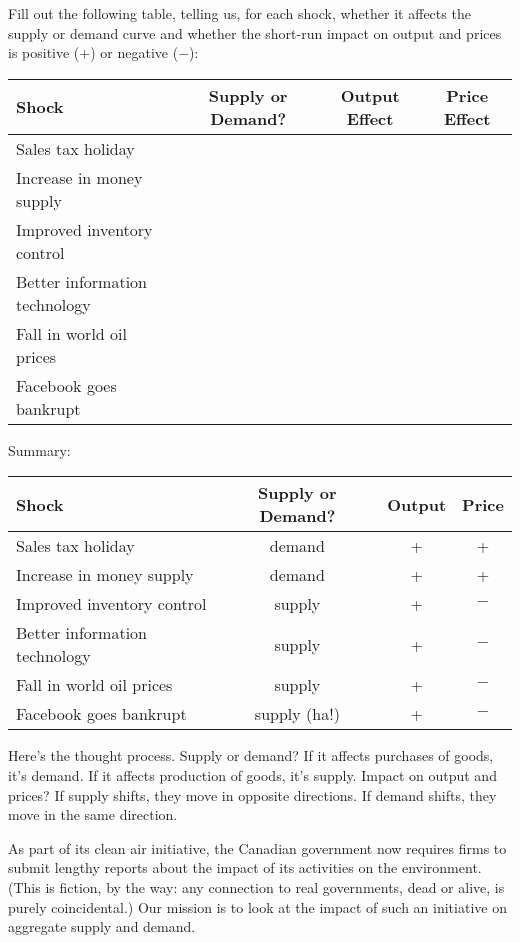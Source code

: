 \documentclass[12pt]{exam}
\begin{document}
\begin{questions}
Fill out the following table,
telling us, for each shock,
whether it affects the supply or demand curve
and whether the short-run impact on
output and prices is positive (+) or negative ($-$):

{\small
\begin{center}
\begin{tabular}{lccc}
\toprule
Shock        &  Supply or Demand?  &  Output Effect & Price Effect \\
\midrule
Sales tax holiday \\
Increase in money supply \\
Improved inventory control \\
Better information technology \\
Fall in world oil prices \\
Facebook goes bankrupt \\
\bottomrule
\end{tabular}
\end{center}
}
\smallskip

\begin{solution}
Summary:

{\small
\begin{center}
\begin{tabular}{lccc}
\toprule
Shock        &  Supply or Demand?  &  Output & Price  \\
\midrule
Sales tax holiday &  demand  & + & + \\
Increase in money supply  & demand & + & + \\
Improved inventory control &  supply & + & $-$ \\
Better information technology & supply & + & $-$ \\
Fall in world oil prices    & supply &  + & $-$ \\
Facebook goes bankrupt      &  supply (ha!) & + & $-$ \\
\bottomrule
\end{tabular}
\end{center}
}
Here's the thought process.
Supply or demand?  If it affects purchases of goods, it's demand.
If it affects production of goods, it's supply.
Impact on output and prices?
If supply shifts, they move in opposite directions.
If demand shifts, they move in the same direction.
\end{solution}


As part of its clean air initiative,
the Canadian government now requires firms to submit lengthy reports
about the impact of its activities on the environment.
(This is fiction, by the way:  any connection to real governments,
dead or alive, is purely coincidental.)
Our mission is to look at the impact of such an initiative
on aggregate supply and demand.


\end{questions}
\end{document}
